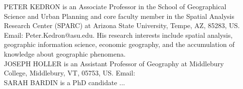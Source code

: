 \documentclass[]{interact}
\theoremstyle{plain}%
\theoremstyle{definition}
\theoremstyle{remark}
\begin{document}
\newpage
\noindent PETER KEDRON is an Associate Professor in the School of Geographical Science and Urban Planning and core faculty member in the Spatial Analysis Research Center (SPARC) at Arizona State University, Tempe, AZ, 85283, US. Email: Peter.Kedron@asu.edu. His research interests include spatial analysis, geographic information science, economic geography, and the accumulation of knowledge about geographic phenomena. \\  
  
\noindent JOSEPH HOLLER is an Assistant Professor of Geography at Middlebury College, Middlebury, VT, 05753, US. Email: \\
  
\noindent SARAH BARDIN is a PhD candidate ...
\end{document}
